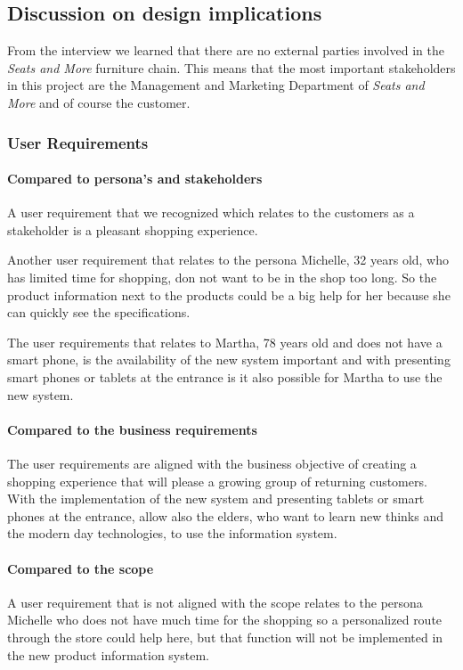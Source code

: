 \documentclass[a4paper]{article}
\begin{document}
\subsection{Discussion on design implications}
From the interview we learned that there are no external parties involved in the \textit{Seats and More} furniture chain. This means that the most important stakeholders in this project are the Management and Marketing Department of \textit{Seats and More} and of course the customer.

\subsubsection*{User Requirements}

\paragraph*{Compared to persona's and stakeholders}
A user requirement that we recognized which relates to the customers as a stakeholder is a pleasant shopping experience. 

Another user requirement that relates to the persona Michelle, 32 years old, who has limited time for shopping, don not want to be in the shop too long. So the product information next to the products could be a big help for her because she can quickly see the specifications. 

The user requirements that relates to Martha, 78 years old and does not have a smart phone, is the availability of the new system important and with presenting smart phones or tablets at the entrance is it also possible for Martha to use the new system.

\paragraph{Compared to the business requirements}
The user requirements are aligned with the business objective of creating a shopping experience that will please a growing group of returning customers. With the implementation of the new system and presenting tablets or smart phones at the entrance, allow also the elders, who want to learn new thinks and the modern day technologies, to use the information system.

\paragraph{Compared to the scope}
A user requirement that is not aligned with the scope relates to the persona Michelle who does not have much time for the shopping so a personalized route through the store could help here, but that function will not be implemented in the new product information system.
\end{document}
